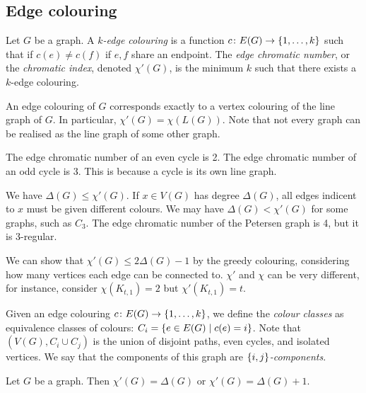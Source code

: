 \subsection{Edge colouring}
\begin{definition}
	Let \( G \) be a graph.
	A \emph{\( k \)-edge colouring} is a function \( c \colon E(G) \to \qty{1, \dots, k} \) such that if \( c(e) \neq c(f) \) if \( e, f \) share an endpoint.
	The \emph{edge chromatic number}, or the \emph{chromatic index}, denoted \( \chi'(G) \), is the minimum \( k \) such that there exists a \( k \)-edge colouring.
\end{definition}
\begin{remark}
	An edge colouring of \( G \) corresponds exactly to a vertex colouring of the line graph of \( G \).
	In particular, \( \chi'(G) = \chi(L(G)) \).
	Note that not every graph can be realised as the line graph of some other graph.
\end{remark}
\begin{example}
	The edge chromatic number of an even cycle is 2.
	The edge chromatic number of an odd cycle is 3.
	This is because a cycle is its own line graph.
\end{example}
\begin{example}
	We have \( \Delta(G) \leq \chi'(G) \).
	If \( x \in V(G) \) has degree \( \Delta(G) \), all edges indicent to \( x \) must be given different colours.
	We may have \( \Delta(G) < \chi'(G) \) for some graphs, such as \( C_3 \).
	The edge chromatic number of the Petersen graph is 4, but it is 3-regular.

	We can show that \( \chi'(G) \leq 2\Delta(G) - 1 \) by the greedy colouring, considering how many vertices each edge can be connected to.
	\( \chi' \) and \( \chi \) can be very different, for instance, consider \( \chi(K_{t,1}) = 2 \) but \( \chi'(K_{t,1}) = t \).
\end{example}
Given an edge colouring \( c \colon E(G) \to \qty{1, \dots, k} \), we define the \emph{colour classes} as equivalence classes of colours: \( C_i = \qty{e \in E(G) \mid c(e) = i} \).
Note that \( (V(G), C_i \cup C_j) \) is the union of disjoint paths, even cycles, and isolated vertices.
We say that the components of this graph are \emph{\( \qty{i,j} \)-components}.
\begin{theorem}[Vizing]
	Let \( G \) be a graph.
	Then \( \chi'(G) = \Delta(G) \) or \( \chi'(G) = \Delta(G) + 1 \).
\end{theorem}
